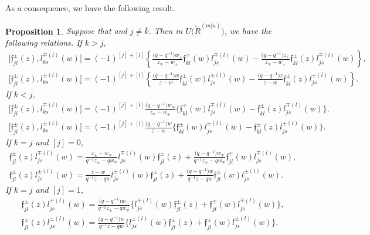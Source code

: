 \documentclass[10pt,a4paper]{amsart}
\numberwithin{equation}{section}
\newtheorem{Proposition}[Theorem]{Proposition}
 { \theoremstyle{definition}
\newtheorem{Definition}[Theorem]{Definition}
\newtheorem{Note}[Theorem]{Note}
\newtheorem{Example}[Theorem]{Example}
\newtheorem{Remark}[Theorem]{Remark} }
\begin{document}
As a consequence, we have the following result.
\begin{Proposition}\label{pr4}
Suppose that  and $j\neq \overline{k}$. Then in $U\bigl(\widetilde{R}^{(m|n)}\bigr)$, we have the following relations.
If $k>j$,
\begin{gather*}
 \bigl[\mathfrak{f}_{jl}^{\pm}(z), l_{ks}^{\mp(l)}(w)\bigr]=(-1)^{[j]+[l]}\left\{\frac{\bigl(q-q^{-1}\bigr)w_{\pm}}{z_{\mp}-w_{\pm}}\mathfrak{f}_{kl}^{\mp}(w)l_{js}^{\mp(l)}(w) -\frac{\bigl(q-q^{-1}\bigr)z_{\mp}}{z_{\mp}-w_{\pm}}\mathfrak{f}_{kl}^{\pm}(z)l_{js}^{\mp(l)}(w)\right\},\\
 \bigl[\mathfrak{f}_{jl}^{\pm}(z), l_{ks}^{\pm(l)}(w)\bigr]=(-1)^{[j]+[l]}\left\{\frac{\bigl(q-q^{-1}\bigr)w}{z-w}\mathfrak{f}_{kl}^{\pm}(w)l_{js}^{\pm(l)}(w) -\frac{\bigl(q-q^{-1}\bigr)z}{z-w}\mathfrak{f}_{kl}^{\pm}(z)l_{js}^{\pm(l)}(w)\right\}.
\end{gather*}
If $k<j$,
\begin{gather*}
 \bigl[\mathfrak{f}_{jl}^{\pm}(z), l_{ks}^{\mp(l)}(w)\bigr]=(-1)^{[j]+[l]}\frac{\bigl(q-q^{-1}\bigr)w_{\mp}}{z_{\mp}-w_{\pm}}\bigl\{\mathfrak{f}_{kl}^{\mp}(w)l_{js}^{\mp(l)}(w) -\mathfrak{f}_{kl}^{\pm}(z)l_{js}^{\mp(l)}(w)\bigr\},\\
 \bigl[\mathfrak{f}_{jl}^{\pm}(z), l_{ks}^{\pm(l)}(w)\bigr]=(-1)^{[j]+[l]}\frac{\bigl(q-q^{-1}\bigr)w}{z-w}\bigl\{\mathfrak{f}_{kl}^{\pm}(w)l_{js}^{\pm(l)}(w) -\mathfrak{f}_{kl}^{\pm}(z)l_{js}^{\pm(l)}(w)\bigr\}.
\end{gather*}
If $k=j$ and $[j]=0$,
\begin{gather*}
 \mathfrak{f}_{jl}^{\pm}(z)l_{js}^{\mp(l)}(w)=\frac{z_{\pm}-w_{\mp}}{q^{-1}z_{\pm}-qw_{\mp}}l_{js}^{\mp(l)}(w)\mathfrak{f}_{jl}^{\pm}(z) +\frac{\bigl(q-q^{-1}\bigr)w_{\mp}}{q^{-1}z_{\pm}-qw_{\mp}}\mathfrak{f}_{jl}^{\mp}(w)l_{js}^{\mp(l)}(w),\\
 \mathfrak{f}_{jl}^{\pm}(z)l_{js}^{\pm(l)}(w)=\frac{z-w}{q^{-1}z-qw}l_{js}^{\pm(l)}(w)\mathfrak{f}_{jl}^{\pm}(z) +\frac{\bigl(q-q^{-1}\bigr)w}{q^{-1}z-qw}\mathfrak{f}_{jl}^{\pm}(w)l_{js}^{\pm(l)}(w).
\end{gather*}
If $k=j$ and $[j]=1$,
\begin{gather*}
 \mathfrak{f}_{jl}^{\pm}(z)l_{js}^{\mp(l)}(w)=\frac{\bigl(q-q^{-1}\bigr)w_{\mp}}{q^{-1}z_{\pm}-qw_{\mp}}\bigl\{l_{js}^{\mp(l)}(w)\mathfrak{f}_{jl}^{\pm}(z) +\mathfrak{f}_{jl}^{\mp}(w)l_{js}^{\mp(l)}(w)\bigr\},\\
 \mathfrak{f}_{jl}^{\pm}(z)l_{js}^{\pm(l)}(w)=\frac{\bigl(q-q^{-1}\bigr)w}{q^{-1}z-qw}\bigl\{l_{js}^{\pm(l)}(w)\mathfrak{f}_{jl}^{\pm}(z) +\mathfrak{f}_{jl}^{\pm}(w)l_{js}^{\pm(l)}(w)\bigr\}.
\end{gather*}
\end{Proposition}
\end{document}

